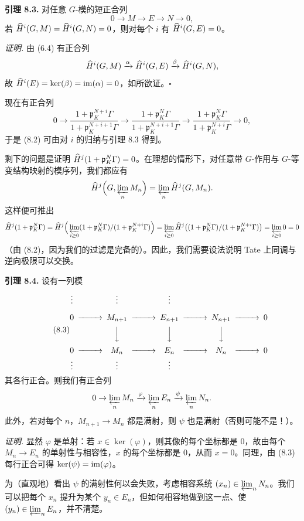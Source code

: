 \textbf{引理 8.3.} 对任意 $G$-模的短正合列
\[
0\to M\to E\to N\to 0,
\]
若 $\widehat{H}^i(G,M)=\widehat{H}^i(G,N)=0$，则对每个 $i$ 有 $\widehat{H}^i(G,E)=0$。

\textit{证明.} 由 (6.4) 有正合列
\[
\widehat{H}^i(G,M)\xrightarrow{\alpha}\widehat{H}^i(G,E)\xrightarrow{\beta}\widehat{H}^i(G,N),
\]
故 $\widehat{H}^i(E)=\ker(\beta)=\operatorname{im}(\alpha)=0$，如所欲证。\hfill$\square$

现在有正合列
\[
0\to\frac{1+\mathfrak p_K^{N+i}\Gamma}{1+\mathfrak p_K^{N+i+1}\Gamma}\to\frac{1+\mathfrak p_K^{N}\Gamma}{1+\mathfrak p_K^{N+i+1}\Gamma}\to\frac{1+\mathfrak p_K^{N}\Gamma}{1+\mathfrak p_K^{N+i}\Gamma}\to 0,
\]
于是 (8.2) 可由对 $i$ 的归纳与引理 8.3 得到。

剩下的问题是证明 $\widehat{H}^j(1+\mathfrak p_K^N\Gamma)=0$。在理想的情形下，对任意带 $G$-作用与 $G$-等变结构映射的模序列，我们都应有
\[
\widehat{H}^j\Big(G,\varprojlim_n M_n\Big)=\varprojlim_n\widehat{H}^j(G,M_n).
\]
这样便可推出
\[
\widehat{H}^j(1+\mathfrak p_K^N\Gamma)
=\widehat{H}^j\Big(\varprojlim_{i\ge 0}(1+\mathfrak p_K^N\Gamma)/(1+\mathfrak p_K^{N+i}\Gamma)\Big)
=\varprojlim_{i\ge 0}\widehat{H}^j\big((1+\mathfrak p_K^N\Gamma)/(1+\mathfrak p_K^{N+i}\Gamma)\big)
=\varprojlim_{i\ge 0}0=0
\]
（由 (8.2)，因为我们的过滤是完备的）。因此，我们需要设法说明 Tate 上同调与逆向极限可以交换。

\textbf{引理 8.4.} 设有一列模
\begin{equation}\tag{8.3}
\begin{CD}
\vdots @. \vdots @. \vdots @. @.\\
0 @>>> M_{n+1} @>>> E_{n+1} @>>> N_{n+1} @>>> 0\\
@. @VVV @VVV @VVV @.\\
0 @>>> M_{n} @>>> E_{n} @>>> N_{n} @>>> 0\\
\vdots @. \vdots @. \vdots @. @.
\end{CD}
\end{equation}
其各行正合。则我们有正合列
\[
0\to\varprojlim_n M_n\xrightarrow{\varphi}\varprojlim_n E_n\xrightarrow{\psi}\varprojlim_n N_n .
\]
此外，若对每个 $n$，$M_{n+1}\to M_n$ 都是满射，则 $\psi$ 也是满射（否则可能不是！）。

\textit{证明.} 显然 $\varphi$ 是单射：若 $x\in\ker(\varphi)$，则其像的每个坐标都是 $0$，故由每个 $M_n\to E_n$ 的单射性与相容性，$x$ 的每个坐标都是 $0$，从而 $x=0$。同理，由 (8.3) 每行正合可得 $\ker(\psi)=\operatorname{im}(\varphi)$。

为（直观地）看出 $\psi$ 的满射性何以会失败，考虑相容系统 $(x_n)\in\varprojlim_n N_n$。我们可以把每个 $x_n$ 提升为某个 $y_n\in E_n$，但如何相容地做到这一点、使 $(y_n)\in\varprojlim_n E_n$，并不清楚。

